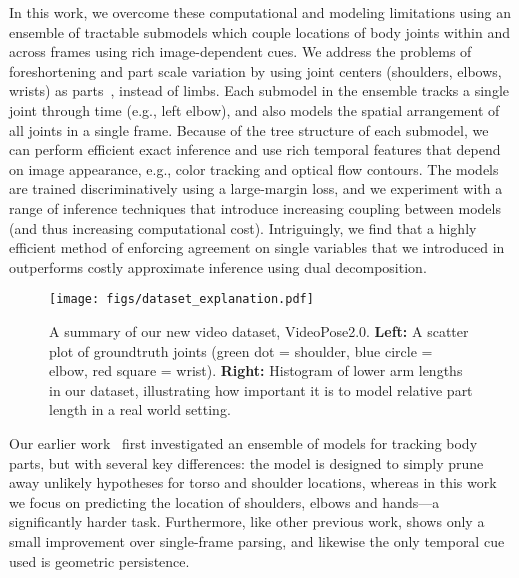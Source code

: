 In this work, we overcome these computational and modeling limitations
using an ensemble of tractable submodels which couple
locations of body joints within and across frames using rich
image-dependent cues.  We address the problems of foreshortening and
part scale variation by using joint centers (shoulders, elbows,
wrists) as parts~\cite{lee06,urtasun08,rogez08}, instead of
limbs. Each submodel in the ensemble tracks a
single joint through time (e.g., left elbow), and also models the
spatial arrangement of all joints in a single frame.  Because of the
tree structure of each submodel, we can perform efficient exact
inference and use rich temporal features that depend on image
appearance, e.g., color tracking and optical flow contours. The models
are trained discriminatively using a large-margin loss, and we
experiment with a range of inference techniques that introduce
increasing coupling between models (and thus increasing computational
cost). Intriguingly, we find that a highly efficient method of
enforcing agreement on single variables that we introduced in
\cite{weisssapp10} outperforms costly approximate inference using dual
decomposition.

\begin{figure}[tb!]
\centering
\texttt{[image: figs/dataset\_explanation.pdf]}
\caption{\small \label{fig:dataset} A summary of our new video dataset, VideoPose2.0. 
\textbf{Left:} A scatter plot of groundtruth joints (green dot = shoulder, blue 
circle = elbow, red square = wrist). \textbf{Right:} Histogram of lower arm 
lengths in our dataset, illustrating how important it is to model relative part 
length in a real world setting.  }
\end{figure}


Our earlier work~\cite{weisssapp10} first investigated an ensemble of models 
for tracking body parts, but with several key differences: the model is 
designed to simply prune away unlikely hypotheses for torso and shoulder
locations, whereas in this work we focus on predicting the location of 
shoulders, elbows and hands---a significantly harder task.  Furthermore, like 
other previous work, \cite{weisssapp10} shows only a small improvement over 
single-frame parsing, and likewise the only temporal cue used is geometric persistence.



